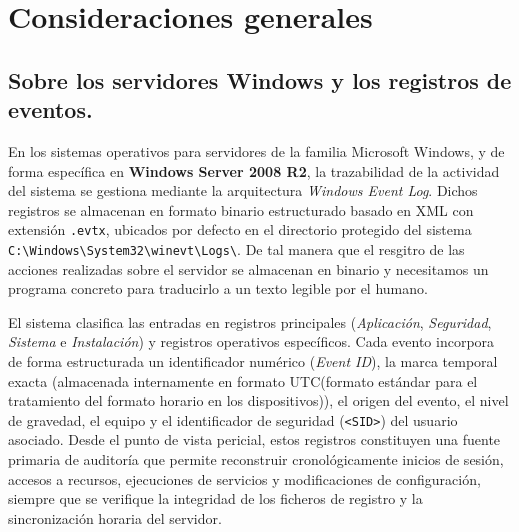 \section{Consideraciones generales}

\subsection{Sobre los servidores Windows y los registros de eventos.}
En los sistemas operativos para servidores de la familia Microsoft Windows, y de forma específica en \textbf{Windows Server 2008 R2}, la trazabilidad de la actividad del sistema se gestiona mediante la arquitectura \textit{Windows Event Log}. Dichos registros se almacenan en formato binario estructurado basado en XML con extensión \texttt{.evtx}, ubicados por defecto en el directorio protegido del sistema \texttt{C:\textbackslash Windows\textbackslash System32\textbackslash winevt\textbackslash Logs\textbackslash}. De tal manera que el resgitro de las acciones realizadas sobre el servidor se almacenan en binario y necesitamos un programa concreto para traducirlo a un texto legible por el humano.

El sistema clasifica las entradas en registros principales (\textit{Aplicación}, \textit{Seguridad}, \textit{Sistema} e \textit{Instalación}) y registros operativos específicos. Cada evento incorpora de forma estructurada un identificador numérico (\textit{Event ID}), la marca temporal exacta (almacenada internamente en formato UTC(formato estándar para el tratamiento del formato horario en los dispositivos)), el origen del evento, el nivel de gravedad, el equipo y el identificador de seguridad (\texttt{<SID>}) del usuario asociado. Desde el punto de vista pericial, estos registros constituyen una fuente primaria de auditoría que permite reconstruir cronológicamente inicios de sesión, accesos a recursos, ejecuciones de servicios y modificaciones de configuración, siempre que se verifique la integridad de los ficheros de registro y la sincronización horaria del servidor.

